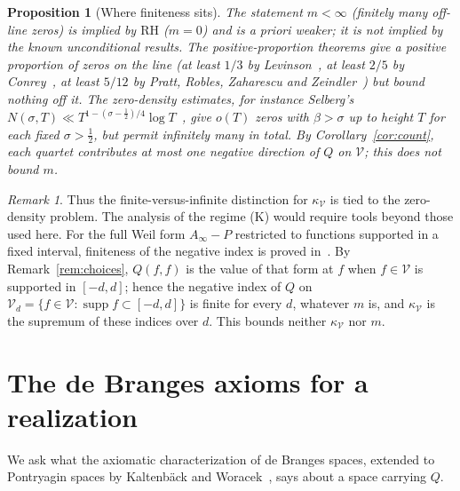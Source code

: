 \documentclass[11pt]{amsart}
\newtheorem{proposition}[theorem]{Proposition}
\theoremstyle{definition}
\theoremstyle{remark}
\newtheorem{remark}[theorem]{Remark}
\newcommand{\RH}{\mathrm{RH}}
\newcommand{\half}{\tfrac12}
\newcommand{\kV}{\kappa_{\mathcal V}}
\begin{document}
\begin{proposition}[Where finiteness sits]\label{prop:finiteness}
The statement $m<\infty$ (finitely many off-line zeros) is implied by $\RH$ ($m=0$) and is a
priori weaker; it is not implied by the known unconditional results. The positive-proportion
theorems give a positive proportion of zeros on the line (at least $1/3$ by
Levinson~\cite{Levinson}, at least $2/5$ by Conrey~\cite{Conrey}, at least $5/12$ by Pratt,
Robles, Zaharescu and Zeindler~\cite{PRZZ}) but bound nothing off it. The zero-density estimates,
for instance Selberg's $N(\sigma,T)\ll T^{1-(\sigma-\frac12)/4}\log T$~\cite{Selberg}, give
$o(T)$ zeros with $\beta>\sigma$ up to height $T$ for each fixed $\sigma>\half$, but permit
infinitely many in total. By Corollary~\ref{cor:count}, each quartet contributes at most one
negative direction of $Q$ on $\mathcal V$; this does not bound $m$.
\end{proposition}

\begin{remark}
Thus the finite-versus-infinite distinction for $\kV$ is tied to the zero-density problem. The
analysis of the regime (K) would require tools beyond those used here. For the full Weil form
$A_\infty-P$ restricted to functions supported in a fixed interval, finiteness of the negative
index is proved in~\cite{P11}. By Remark~\ref{rem:choices}, $Q(f,f)$ is the value of that form at
$f$ when $f\in\mathcal V$ is supported in $[-d,d]$; hence the negative index of $Q$ on
$\mathcal V_d=\{f\in\mathcal V:\operatorname{supp}f\subset[-d,d]\}$ is finite for every $d$, whatever
$m$ is, and $\kV$ is the supremum of these indices over $d$. This bounds neither $\kV$ nor $m$.
\end{remark}

\section{The de Branges axioms for a realization}\label{sec:rigidity}

We ask what the axiomatic characterization of de Branges spaces, extended to Pontryagin spaces by
Kaltenb\"ack and Woracek~\cite{KW}, says about a space carrying $Q$.
\end{document}
